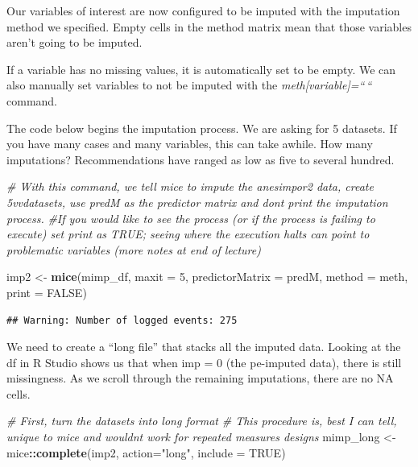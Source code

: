 \documentclass[
  11pt,
]{book}
\newenvironment{Shaded}{\begin{snugshade}}{\end{snugshade}}
\newcommand{\AttributeTok}[1]{\textcolor[rgb]{0.27,0.27,0.27}{#1}}
\newcommand{\CommentTok}[1]{\textcolor[rgb]{0.37,0.37,0.37}{\textit{#1}}}
\newcommand{\ConstantTok}[1]{\textcolor[rgb]{0.37,0.37,0.37}{#1}}
\newcommand{\DecValTok}[1]{\textcolor[rgb]{0.06,0.06,0.06}{#1}}
\newcommand{\FunctionTok}[1]{\textcolor[rgb]{0.27,0.27,0.27}{\textbf{#1}}}
\newcommand{\NormalTok}[1]{#1}
\newcommand{\OtherTok}[1]{\textcolor[rgb]{0.37,0.37,0.37}{#1}}
\newcommand{\SpecialCharTok}[1]{\textcolor[rgb]{0.43,0.43,0.43}{\textbf{#1}}}
\newcommand{\StringTok}[1]{\textcolor[rgb]{0.5,0.5,0.5}{#1}}
\begin{document}
Our variables of interest are now configured to be imputed with the imputation method we specified. Empty cells in the method matrix mean that those variables aren't going to be imputed.

If a variable has no missing values, it is automatically set to be empty. We can also manually set variables to not be imputed with the \emph{meth{[}variable{]}=``\,``} command.

The code below begins the imputation process. We are asking for 5 datasets. If you have many cases and many variables, this can take awhile. How many imputations? Recommendations have ranged as low as five to several hundred.

\begin{Shaded}
\begin{Highlighting}[]
\CommentTok{\# With this command, we tell mice to impute the anesimpor2 data, create 5vvdatasets, use predM as the predictor matrix and don\textquotesingle{}t print the imputation process. }
\CommentTok{\#If you would like to see the process (or if the process is failing to execute) set print as TRUE; seeing where the execution halts can point to problematic variables (more notes at end of lecture)}

\NormalTok{imp2 }\OtherTok{\textless{}{-}} \FunctionTok{mice}\NormalTok{(mimp\_df, }\AttributeTok{maxit =} \DecValTok{5}\NormalTok{, }
             \AttributeTok{predictorMatrix =}\NormalTok{ predM, }
             \AttributeTok{method =}\NormalTok{ meth, }\AttributeTok{print =}  \ConstantTok{FALSE}\NormalTok{)}
\end{Highlighting}
\end{Shaded}

\begin{verbatim}
## Warning: Number of logged events: 275
\end{verbatim}

We need to create a ``long file'' that stacks all the imputed data. Looking at the df in R Studio shows us that when imp = 0 (the pe-imputed data), there is still missingness. As we scroll through the remaining imputations, there are no NA cells.

\begin{Shaded}
\begin{Highlighting}[]
\CommentTok{\# First, turn the datasets into long format}
\CommentTok{\# This procedure is, best I can tell, unique to mice and wouldn\textquotesingle{}t work for repeated measures designs}
\NormalTok{mimp\_long }\OtherTok{\textless{}{-}}\NormalTok{ mice}\SpecialCharTok{::}\FunctionTok{complete}\NormalTok{(imp2, }\AttributeTok{action=}\StringTok{"long"}\NormalTok{, }\AttributeTok{include =} \ConstantTok{TRUE}\NormalTok{)}
\end{Highlighting}
\end{Shaded}
\end{document}
